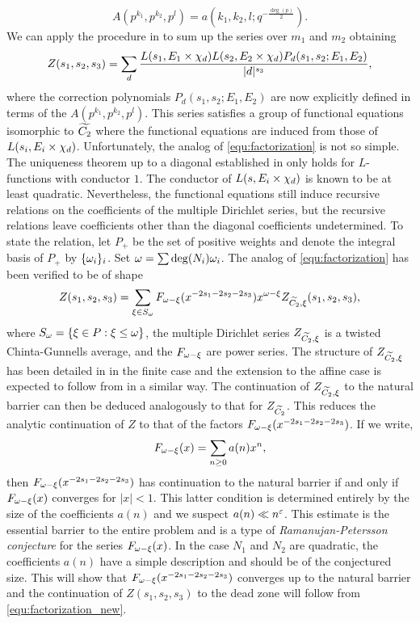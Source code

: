 \documentclass[12pt,reqno,oneside]{amsart}
\begin{document}
\[
  A(p^{k_{1}},p^{k_{2}},p^{l}) = a\left(k_{1},k_{2},l;q^{-\frac{\deg(p)}{2}}\right). 
\]
We can apply the procedure in \cite{D} to sum up the series over $m_{1}$ and $m_{2}$ obtaining
\[
  Z(s_{1},s_{2},s_{3}) =  \sum_{d}\frac{L(s_{1},E_{1} \times \chi_{d})L(s_{2},E_{2} \times \chi_{d})P_{d}(s_{1},s_{2};E_{1},E_{2})}{|d|^{s_{3}}},
\]
where the correction polynomials $P_{d}(s_{1},s_{2};E_{1},E_{2})$ are now explicitly defined in terms of the $A(p^{k_{1}},p^{k_{2}},p^{l})$. This series satisfies a group of functional equations isomorphic to $\widetilde{C_{2}}$ where the functional equations are induced from those of $L(s_{i},E_{i} \times \chi_{d})$. Unfortunately, the analog of \cref{equ:factorization} is not so simple. The uniqueness theorem up to a diagonal established in \cite{W} only holds for $L$-functions with conductor $1$. The conductor of $L(s,E_{i} \times \chi_{d})$ is known to be at least quadratic. Nevertheless, the functional equations still induce recursive relations on the coefficients of the multiple Dirichlet series, but the recursive relations leave coefficients other than the diagonal coefficients undetermined. To state the relation, let $P_{+}$ be the set of positive weights and denote the integral basis of $P_{+}$ by $\{\omega_{i}\}_{i}$. Set $\omega = \sum\deg(N_{i})\omega_{i}$. The analog of \cref{equ:factorization} has been verified to be of shape
\begin{equation}\label{equ:factorization_new}
  Z(s_{1},s_{2},s_{3}) = \sum_{\xi \in S_{\omega}}F_{\omega-\xi}(x^{-2s_{1}-2s_{2}-2s_{3}})x^{\omega-\xi}Z_{\widetilde{C_{2}},\xi}(s_{1},s_{2},s_{3}),
\end{equation}
where $S_{\omega} = \{\xi \in P:\xi \le \omega\}$, the multiple Dirichlet series $Z_{\widetilde{C_{2}},\xi}$ is a twisted Chinta-Gunnells average, and the $F_{\omega-\xi}$ are power series. The structure of $Z_{\widetilde{C_{2}},\xi}$ has been detailed in \cite{CFG} in the finite case and the extension to the affine case is expected to follow from \cite{W} in a similar way. The continuation of $Z_{\widetilde{C_{2}},\xi}$ to the natural barrier can then be deduced analogously to that for $Z_{\widetilde{C_{2}}}$. This reduces the analytic continuation of $Z$ to that of the factors $F_{\omega-\xi}(x^{-2s_{1}-2s_{2}-2s_{3}})$. If we write,
\[
  F_{\omega-\xi}(x) = \sum_{n \ge 0}a(n)x^{n},
\]
then $F_{\omega-\xi}(x^{-2s_{1}-2s_{2}-2s_{3}})$ has continuation to the natural barrier if and only if $F_{\omega-\xi}(x)$ converges for $|x| < 1$. This latter condition is determined entirely by the size of the coefficients $a(n)$ and we suspect $a(n) \ll n^{\varepsilon}$. This estimate is the essential barrier to the entire problem and is a type of \textit{Ramanujan-Petersson conjecture} for the series $F_{\omega-\xi}(x)$. In the case $N_{1}$ and $N_{2}$ are quadratic, the coefficients $a(n)$ have a simple description and should be of the conjectured size. This will show that $F_{\omega-\xi}(x^{-2s_{1}-2s_{2}-2s_{3}})$ converges up to the natural barrier and the continuation of $Z(s_{1},s_{2},s_{3})$ to the dead zone will follow from \cref{equ:factorization_new}.
\end{document}
